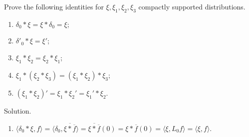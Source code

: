 \documentclass[12pt, draft,reqno,a4paper, twoside]{amsproc}
\newcommand{\gen}[1]{\langle{#1}\rangle}
\newcommand{\widebar}{\overline}
\newenvironment{sol}{\sc Solution. \rm}{\hfill \qedsymbol\bigskip}
\begin{document}
\begin{exer} Prove the following identities for $\xi,\xi_1,\xi_2,\xi_3$ compactly supported distributions.
\begin{enumerate}
\item $\delta_0\ast \xi=\xi\ast \delta_0=\xi$;
\item $\delta'_0\ast \xi=\xi'$;
\item $\xi_1\ast \xi_2=\xi_2\ast\xi_1$;
\item $\xi_1\ast(\xi_2\ast \xi_3)=(\xi_1\ast\xi_2)\ast\xi_3$;
\item $(\xi_1\ast \xi_2)'=\xi_1\ast\xi_2'=\xi_1'\ast\xi_2$.
\end{enumerate}
\end{exer}
\begin{sol}
\begin{enumerate}
\item $\gen{\delta_0\ast\xi,f}=\gen{\delta_0,\widebar{\xi\ast\widebar{f}}}=\widebar{\xi\ast\widebar{f}}(0)=\xi\ast\widebar{f}(0)=\gen{\xi,L_0f}=\gen{\xi,f}.$


\end{enumerate}
\end{sol}
\end{document}
